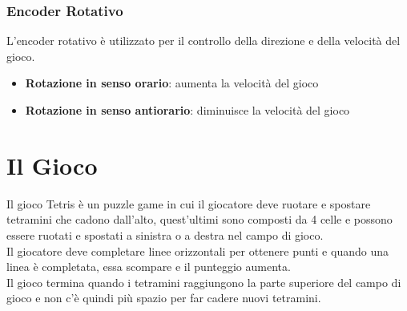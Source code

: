 \documentclass[a4paper, 12pt]{article}
\begin{document}
\subsubsection{Encoder Rotativo}
L'encoder rotativo è utilizzato per il controllo della direzione e della velocità del gioco.\\
\begin{itemize}
    \item \textbf{Rotazione in senso orario}: aumenta la velocità del gioco
    \item \textbf{Rotazione in senso antiorario}: diminuisce la velocità del gioco
\end{itemize}

\section{Il Gioco}
Il gioco Tetris è un puzzle game in cui il giocatore deve ruotare e spostare tetramini che cadono dall'alto, quest'ultimi sono composti da
4 celle e possono essere ruotati e spostati a sinistra o a destra nel campo di gioco.\\
Il giocatore deve completare linee orizzontali per ottenere punti e quando una linea è completata, essa scompare e il punteggio aumenta.\\
Il gioco termina quando i tetramini raggiungono la parte superiore del campo di gioco e non c'è quindi più spazio per far cadere nuovi tetramini.\\
\end{document}
